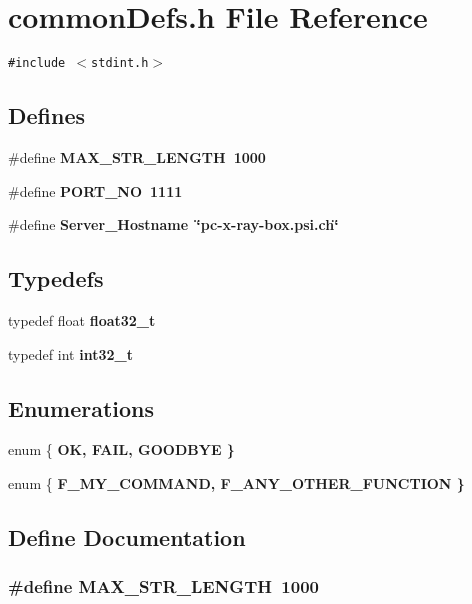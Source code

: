 \section{common\-Defs.h File Reference}
\label{commonDefs_8h}
{\tt \#include $<$stdint.h$>$}\par
\subsection*{Defines}
\begin{CompactItemize}
\item 
\#define \bf{MAX\_\-STR\_\-LENGTH}~1000
\item 
\#define \bf{PORT\_\-NO}~1111
\item 
\#define \bf{Server\_\-Hostname}~\char`\"{}pc-x-ray-box.psi.ch\char`\"{}
\end{CompactItemize}
\subsection*{Typedefs}
\begin{CompactItemize}
\item 
typedef float \bf{float32\_\-t}
\item 
typedef int \bf{int32\_\-t}
\end{CompactItemize}
\subsection*{Enumerations}
\begin{CompactItemize}
\item 
enum \{ \bf{OK}, 
\bf{FAIL}, 
\bf{GOODBYE}
 \}
\item 
enum \{ \bf{F\_\-MY\_\-COMMAND}, 
\bf{F\_\-ANY\_\-OTHER\_\-FUNCTION}
 \}
\end{CompactItemize}


\subsection{Define Documentation}
\subsubsection{\setlength{\rightskip}{0pt plus 5cm}\#define MAX\_\-STR\_\-LENGTH~1000}\label{commonDefs_8h_aa695591372841e2c5580e4ed0f3620f}


